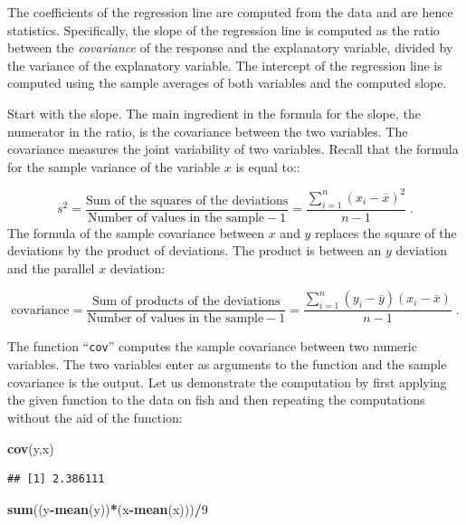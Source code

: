 \documentclass[
]{krantz}
\makeatletter
\newenvironment{Shaded}{\begin{snugshade}}{\end{snugshade}}
\newcommand{\DecValTok}[1]{\textcolor[rgb]{0.00,0.00,0.81}{#1}}
\newcommand{\KeywordTok}[1]{\textcolor[rgb]{0.13,0.29,0.53}{\textbf{#1}}}
\newcommand{\NormalTok}[1]{#1}
\newcommand{\OperatorTok}[1]{\textcolor[rgb]{0.81,0.36,0.00}{\textbf{#1}}}
\newenvironment{kframe}{%
\medskip{}
\setlength{\fboxsep}{.8em}
 \def\at@end@of@kframe{}%
 \ifinner\ifhmode%
  \def\at@end@of@kframe{\end{minipage}}%
  \begin{minipage}{\columnwidth}%
 \fi\fi%
 \def\FrameCommand##1{\hskip\@totalleftmargin \hskip-\fboxsep
 \colorbox{shadecolor}{##1}\hskip-\fboxsep
     \hskip-\linewidth \hskip-\@totalleftmargin \hskip\columnwidth}%
 \MakeFramed {\advance\hsize-\width
   \@totalleftmargin\z@ \linewidth\hsize
   \@setminipage}}%
 {\par\unskip\endMakeFramed%
 \at@end@of@kframe}
\renewenvironment{Shaded}{\begin{kframe}}{\end{kframe}}
\theoremstyle{definition}
\theoremstyle{definition}
\theoremstyle{definition}
\theoremstyle{remark}
\makeatother
\begin{document}
The coefficients of the regression line are computed from the data and
are hence statistics. Specifically, the slope of the regression line is
computed as the ratio between the \emph{covariance} of the response and the
explanatory variable, divided by the variance of the explanatory
variable. The intercept of the regression line is computed using the
sample averages of both variables and the computed slope.

Start with the slope. The main ingredient in the formula for the slope,
the numerator in the ratio, is the covariance between the two variables.
The covariance measures the joint variability of two variables. Recall
that the formula for the sample variance of the variable \(x\) is equal
to::

\[s^2 = \frac{\mbox{Sum of the squares of the deviations}}{\mbox{Number of values in the sample}-1} = \frac{\sum_{i=1}^n (x_i - \bar x)^2}{n-1}\;.\]
The formula of the sample covariance between \(x\) and \(y\) replaces the
square of the deviations by the product of deviations. The product is
between an \(y\) deviation and the parallel \(x\) deviation:

\[\mbox{covariance} = \frac{\mbox{Sum of products of the deviations}}{\mbox{Number of values in the sample}-1} = \frac{\sum_{i=1}^n (y_i-\bar y)(x_i - \bar x)}{n-1}\;.\]

The function ``\texttt{cov}'' computes the sample covariance between two numeric
variables. The two variables enter as arguments to the function and the
sample covariance is the output. Let us demonstrate the computation by
first applying the given function to the data on fish and then repeating
the computations without the aid of the function:

\begin{Shaded}
\begin{Highlighting}[]
\KeywordTok{cov}\NormalTok{(y,x)}
\end{Highlighting}
\end{Shaded}

\begin{verbatim}
## [1] 2.386111
\end{verbatim}

\begin{Shaded}
\begin{Highlighting}[]
\KeywordTok{sum}\NormalTok{((y}\OperatorTok{-}\KeywordTok{mean}\NormalTok{(y))}\OperatorTok{*}\NormalTok{(x}\OperatorTok{-}\KeywordTok{mean}\NormalTok{(x)))}\OperatorTok{/}\DecValTok{9}
\end{Highlighting}
\end{Shaded}
\end{document}
